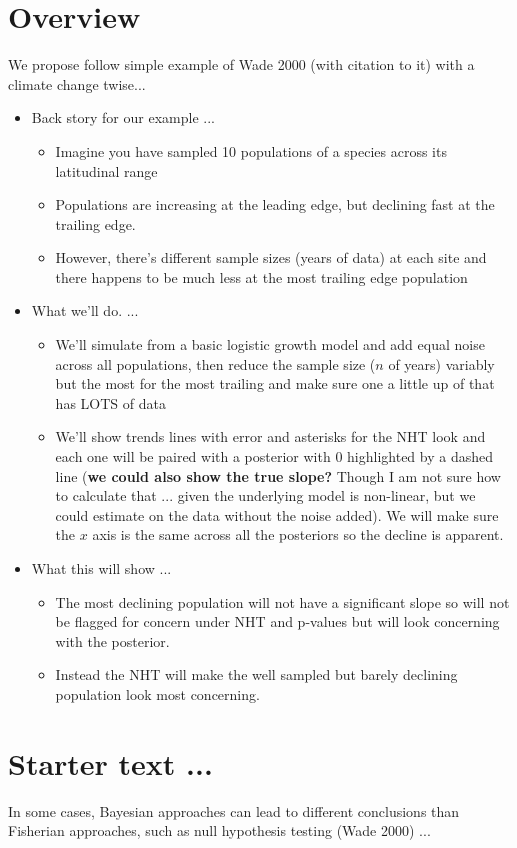 \documentclass[11pt]{article}
\begin{document}

\renewcommand{\refname}{\CHead{}}


\section*{Overview}

We propose follow simple example of Wade 2000 (with citation to it) with a climate change twise... 
\begin{itemize}
\item Back story for our example ... 
\begin{itemize}
\item Imagine you have sampled 10 populations of a species across its latitudinal range
\item Populations are increasing at the leading edge, but declining fast at the trailing edge.
\item However, there's different sample sizes (years of data) at each site and there happens to be much less at the most trailing edge population
\end{itemize}
\item What we'll do. ... 
\begin{itemize}
\item We'll simulate from a basic logistic growth model and add equal noise across all populations, then reduce the sample size ($n$ of years) variably but the most for the most trailing and make sure one a little up of that has LOTS of data
\item We'll show trends lines with error and asterisks for the NHT look and each one will be paired with a posterior with 0 highlighted by a dashed line ({\bf we could also show the true slope?} Though I am not sure how to calculate that ... given the underlying model is non-linear, but we could estimate on the data without the noise added). We will make sure the $x$ axis is the same across all the posteriors so the decline is apparent. 
\end{itemize}
\item What this will show ... 
\begin{itemize}
\item The most declining population will not have a significant slope so will not be flagged for concern under NHT and p-values but will look concerning with the posterior.
\item Instead the NHT will make the well sampled but barely declining population look most concerning. 
\end{itemize}
\end{itemize}


\section*{Starter text ...}

In some cases, Bayesian approaches can lead to different conclusions than Fisherian approaches, such as null hypothesis testing (Wade 2000) ...
\end{document}
